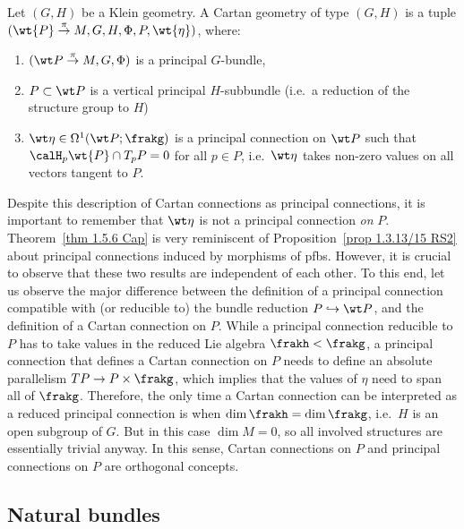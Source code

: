 \begin{defn}\label{def cartan geometry II}
    Let $(G,H)$ be a Klein geometry. A Cartan geometry of type $(G,H)$ is a tuple $(\wt{P}\overset{\pi}{\to}M,G,H,\Phi,P,\wt{\eta})$, where:
    \begin{enumerate}
        \item $(\wt P\overset{\pi}{\to}M,G,\Phi)$ is a principal $G$-bundle,
        \item $P\subset \wt P$ is a vertical principal $H$-subbundle (i.e.\ a reduction of the structure group to $H$)
        \item $\wt\eta\in\Omega^1(\wt P;\frakg)$ is a principal connection on $\wt P$ such that $\calH_p \wt{P}\cap T_pP=0$ for all $p\in P$, i.e.\ $\wt\eta$ takes non-zero values on all vectors tangent to $P$.
    \end{enumerate}
\end{defn}

\begin{rem}
    Despite this description of Cartan connections as principal connections, it is important to remember that $\wt\eta$ is not a principal connection \emph{on} $P$. Theorem~\ref{thm 1.5.6 Cap} is very reminiscent of Proposition~\ref{prop 1.3.13/15 RS2} about principal connections induced by morphisms of \glspl{pfb}. However, it is crucial to observe that these two results are independent of each other. To this end, let us observe the major difference between the definition of a principal connection compatible with (or reducible to) the bundle reduction $P\hookrightarrow \wt P$, and the definition of a Cartan connection on $P$. While a principal connection reducible to $P$ has to take values in the reduced Lie algebra $\frakh<\frakg$, a principal connection that defines a Cartan connection on $P$ needs to define an absolute parallelism $TP\to P\times\frakg$, which implies that the values of $\eta$ need to span all of $\frakg$. Therefore, the only time a Cartan connection can be interpreted as a reduced principal connection is when $\dim\frakh=\dim\frakg$, i.e.\ $H$ is an open subgroup of $G$. But in this case $\dim M=0$, so all involved structures are essentially trivial anyway. In this sense, Cartan connections on $P$ and principal connections on $P$ are orthogonal concepts.
\end{rem}






\subsection{Natural bundles}

